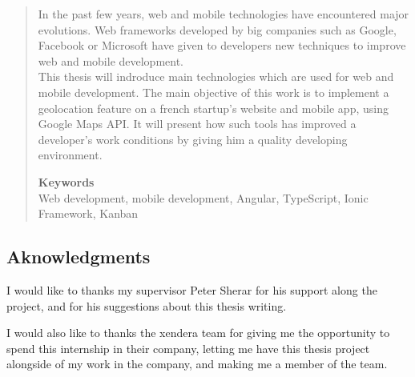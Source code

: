 \documentclass{article}
\begin{document}
        \begin{abstract}
            In the past few years, web and mobile technologies have encountered major evolutions. Web frameworks developed by big companies such
            as Google, Facebook or Microsoft have given to developers new techniques to improve web and mobile development.\\
            This thesis will indroduce main technologies which are used for web and mobile development. The main objective of this work
            is to implement a geolocation feature on a french startup's website and mobile app, using Google Maps API. It will present how
            such tools has improved a developer's work conditions by giving him a quality developing environment.

            \vspace{1cm}
            
            \textbf{Keywords}\\
            Web development, mobile development, Angular, TypeScript, Ionic Framework, Kanban

        \end{abstract}

        \newpage
        \begin{center}
        \section*{Aknowledgments}
        \end{center}
            \vspace{1cm}

            I would like to thanks my supervisor Peter Sherar for his support along the project, and for his suggestions about this thesis writing.

            \vspace{1cm}

            I would also like to thanks the xendera team for giving me the opportunity to spend this internship in their company,
            letting me have this thesis project alongside of my work in the company, and making me a member of the team.

        \newpage
        \tableofcontents
    
        \newpage
        \listoffigures
    
        \listoftables
    
\end{document}
